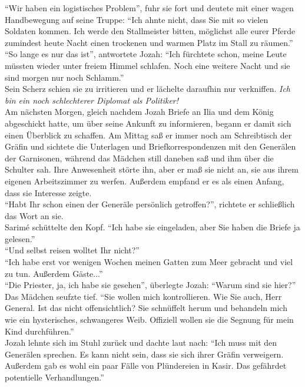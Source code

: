 ``Wir haben ein logistisches Problem'', fuhr sie fort und deutete mit einer wagen Handbewegung auf 
seine Truppe: ``Ich ahnte nicht, dass Sie mit so vielen Soldaten kommen. Ich werde den Stallmeister 
bitten, möglichst alle eurer Pferde zumindest heute Nacht einen trockenen und warmen Platz im Stall 
zu räumen.''\\
``So lange es nur das ist'', antwortete Jozah: ``Ich fürchtete schon, meine Leute müssten wieder 
unter freiem Himmel schlafen. Noch eine weitere Nacht und sie sind morgen nur noch Schlamm.''\\
Sein Scherz schien sie zu irritieren und er lächelte daraufhin nur verkniffen. \textit{Ich bin ein 
noch schlechterer Diplomat als Politiker!}\\

Am nächsten Morgen, gleich nachdem Jozah Briefe an Ilia und dem König abgeschickt hatte, um 
über seine Ankunft zu informieren, begann er damit sich einen Überblick zu schaffen. Am Mittag saß 
er immer noch am Schreibtisch der Gräfin und sichtete die Unterlagen und Briefkorrespondenzen mit 
den Generälen der Garnisonen, während das Mädchen still daneben saß und ihm über die Schulter sah. 
Ihre Anwesenheit störte ihn, aber er maß sie nicht an, sie aus ihrem eigenen Arbeitszimmer zu 
werfen. Außerdem empfand er es als einen Anfang, dass sie Interesse zeigte.\\
``Habt Ihr schon einen der Generäle persönlich getroffen?'', richtete er schließlich das Wort an 
sie.\\
Sarimé schüttelte den Kopf. ``Ich habe sie eingeladen, aber Sie haben die Briefe ja gelesen.''\\
``Und selbst reisen wolltet Ihr nicht?''\\
``Ich habe erst vor wenigen Wochen meinen Gatten zum Meer gebracht und viel zu tun. Außerdem 
Gäste...''\\
``Die Priester, ja, ich habe sie gesehen'', überlegte Jozah: ``Warum sind sie hier?''\\
Das Mädchen seufzte tief. ``Sie wollen mich kontrollieren. Wie Sie auch, Herr General. Ist das 
nicht offensichtlich? Sie schnüffelt herum und behandeln mich wie ein hysterisches, schwangeres 
Weib. Offiziell wollen sie die Segnung für mein Kind durchführen.''\\
Jozah lehnte sich im Stuhl zurück und dachte laut nach: ``Ich muss mit den Generälen sprechen. Es 
kann nicht sein, dass sie sich ihrer Gräfin verweigern. Außerdem gab es wohl ein paar Fälle von 
Plündereien in Kasir. Das gefährdet potentielle Verhandlungen.''\\
